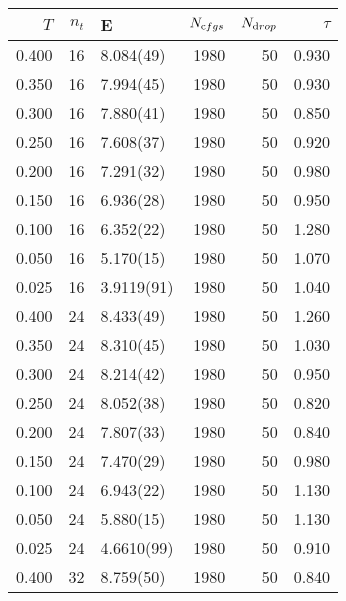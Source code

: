 \begin{tabular}{rrlrrr}
\hline
   $T$ &   $n_t$ & E          &   $N_{\textrm cfgs}$ &   $N_{\textrm drop}$ &   $\tau$ \\
\hline
 0.400 &      16 & 8.084(49)  &                 1980 &                   50 &    0.930 \\
 0.350 &      16 & 7.994(45)  &                 1980 &                   50 &    0.930 \\
 0.300 &      16 & 7.880(41)  &                 1980 &                   50 &    0.850 \\
 0.250 &      16 & 7.608(37)  &                 1980 &                   50 &    0.920 \\
 0.200 &      16 & 7.291(32)  &                 1980 &                   50 &    0.980 \\
 0.150 &      16 & 6.936(28)  &                 1980 &                   50 &    0.950 \\
 0.100 &      16 & 6.352(22)  &                 1980 &                   50 &    1.280 \\
 0.050 &      16 & 5.170(15)  &                 1980 &                   50 &    1.070 \\
 0.025 &      16 & 3.9119(91) &                 1980 &                   50 &    1.040 \\
 0.400 &      24 & 8.433(49)  &                 1980 &                   50 &    1.260 \\
 0.350 &      24 & 8.310(45)  &                 1980 &                   50 &    1.030 \\
 0.300 &      24 & 8.214(42)  &                 1980 &                   50 &    0.950 \\
 0.250 &      24 & 8.052(38)  &                 1980 &                   50 &    0.820 \\
 0.200 &      24 & 7.807(33)  &                 1980 &                   50 &    0.840 \\
 0.150 &      24 & 7.470(29)  &                 1980 &                   50 &    0.980 \\
 0.100 &      24 & 6.943(22)  &                 1980 &                   50 &    1.130 \\
 0.050 &      24 & 5.880(15)  &                 1980 &                   50 &    1.130 \\
 0.025 &      24 & 4.6610(99) &                 1980 &                   50 &    0.910 \\
 0.400 &      32 & 8.759(50)  &                 1980 &                   50 &    0.840 \\

\end{tabular}

